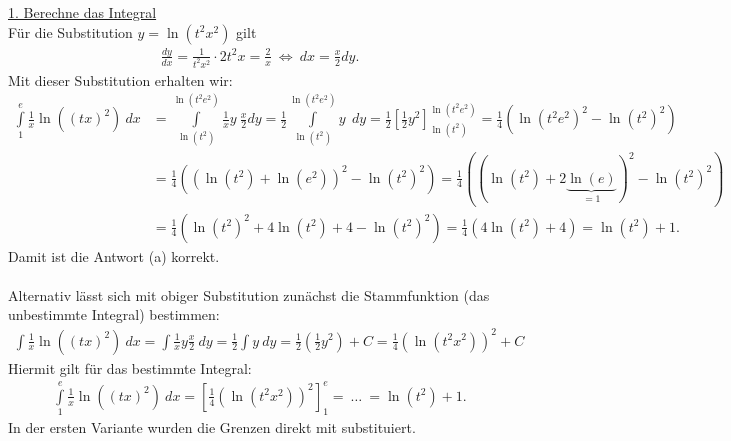 \underline{1. Berechne das Integral}\\
Für die Substitution $y = \ln(t^2 x^2)$ gilt
\begin{align*}
	\frac{dy}{ dx} = \frac{1}{t^2 x^2} \cdot 2 t^2 x
				= \frac{2}{x}
	\ \Leftrightarrow \
	dx = \frac{x}{2} dy.
\end{align*}
Mit dieser Substitution erhalten wir:
\begin{align*}
	\int \limits_1^e \frac{1}{x} \ln\left((tx)^2\right) \ dx
	&=
	\int \limits_{\ln(t^2)}^{\ln(t^2 e^2)} \frac{1}{x} y \ \frac{x}{2} dy
	=
	\frac{1}{2}	\int \limits_{\ln(t^2)}^{\ln(t^2 e^2)}  y \ \ dy
	=
	\frac{1}{2} \left[ \frac{1}{2} y^2 
	\right]_{\ln(t^2)}^{\ln(t^2 e^2)}
	=
	\frac{1}{4}
	\left(
	\ln(t^2 e^2)^2 -  \ln(t^2)^2
	\right)\\
	&= 
	\frac{1}{4}
	\left(
	(\ln(t^2) + \ln(e^2))^2 -  \ln(t^2)^2
	\right)
	=
	\frac{1}{4}
	\left(
	(\ln(t^2) + 2\underbrace{\ln(e)}_{=1})^2 -  \ln(t^2)^2
	\right)\\
	&=
	\frac{1}{4}
	\left(
	\ln(t^2)^2 + 4 \ln(t^2) +4 - \ln(t^2)^2
	\right)
	= 
	\frac{1}{4}
	\left(
	 4 \ln(t^2) +4 
	\right)
	= \ln(t^2) +1.
\end{align*}
Damit ist die Antwort (a) korrekt.\\
\\
Alternativ lässt sich mit obiger Substitution zunächst die Stammfunktion (das unbestimmte Integral) bestimmen:
\begin{align*}
	\int  \frac{1}{x} \ln\left((tx)^2\right) \ dx
	= 
	\int  \frac{1}{x} y \frac{x}{2}\ dy
	=
	\frac{1}{2} \int  y \ dy
	= 
	\frac{1}{2}
	\left(\frac{1}{2} y^2\right) +C
	=
	\frac{1}{4} (\ln(t^2 x^2))^2+C
\end{align*}
Hiermit gilt für das bestimmte Integral:
\begin{align*}
	\int \limits_1^e \frac{1}{x} \ln\left((tx)^2\right) \ dx
	=
	\left[\frac{1}{4} (\ln(t^2 x^2))^2\right]_1^e
	= \ \dots \ = \ln(t^2) +1.
\end{align*}
In der ersten Variante wurden die Grenzen direkt mit substituiert.

 
\newpage

